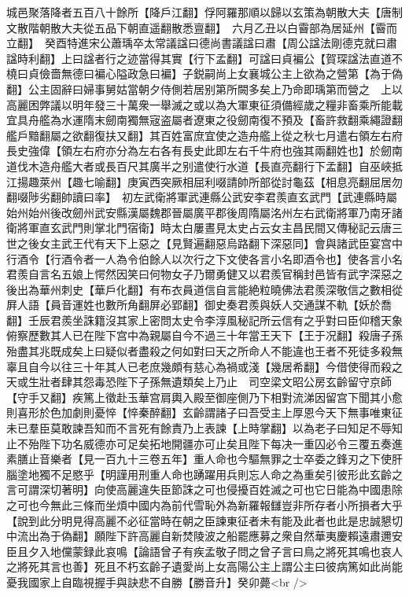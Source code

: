 城邑聚落降者五百八十餘所【降戶江翻】俘阿羅那順以歸以玄策為朝散大夫【唐制文散階朝散大夫從五品下朝直遥翻散悉亶翻】　六月乙丑以白霫部為居延州【霫而立翻】　癸酉特進宋公蕭瑀卒太常議諡曰德尚書議諡曰肅【周公諡法剛德克就曰肅諡時利翻】上曰諡者行之迹當得其實【行下孟翻】可諡曰貞褊公【賀琛諡法直道不橈曰貞儉嗇無德曰褊心隘政急曰褊】子鋭嗣尚上女襄城公主上欲為之營第【為于偽翻】公主固辭曰婦事舅姑當朝夕侍側若居别第所闕多矣上乃命即瑀第而營之　上以高麗困弊議以明年發三十萬衆一舉滅之或以為大軍東征須備經歲之糧非畜乘所能載宜具舟艦為水運隋末劒南獨無宼盗屬者遼東之役劒南復不預及【畜許救翻乘繩證翻艦戶黯翻屬之欲翻復扶又翻】其百姓富庶宜使之造舟艦上從之秋七月遣右領左右府長史強偉【領左右府亦分為左右各有長史此即左右千牛府也強其兩翻姓也】於劒南道伐木造舟艦大者或長百尺其廣半之别遣使行水道【長直亮翻行下孟翻】自巫峽抵江揚趣萊州【趣七喻翻】庚寅西突厥相屈利啜請帥所部從討龜茲【相息亮翻屈居勿翻啜陟劣翻帥讀曰率】　初左武衛將軍武連縣公武安李君羨直玄武門【武連縣時屬始州始州後改劒州武安縣漢屬魏郡晉屬廣平郡後周隋屬洺州左右武衛將軍乃南牙諸衛將軍直玄武門則掌北門宿衛】時太白屢晝見太史占云女主昌民間又傳秘記云唐三世之後女主武王代有天下上惡之【見賢遍翻惡烏路翻下深惡同】會與諸武臣宴宫中行酒令【行酒令者一人為令伯餘人以次行之下文使各言小名即酒令也】使各言小名君羨自言名五娘上愕然因笑曰何物女子乃爾勇健又以君羨官稱封邑皆有武字深惡之後出為華州刺史【華戶化翻】有布衣員道信自言能絶粒曉佛法君羨深敬信之數相從屛人語【員音運姓也數所角翻屏必郢翻】御史奏君羨與妖人交通謀不軌【妖於喬翻】壬辰君羨坐誅籍沒其家上密問太史令李淳風秘記所云信有之乎對曰臣仰稽天象俯察歷數其人已在陛下宫中為親屬自今不過三十年當王天下【王于况翻】殺唐子孫殆盡其兆既成矣上曰疑似者盡殺之何如對曰天之所命人不能違也王者不死徒多殺無辜且自今以往三十年其人已老庶幾頗有慈心為禍或淺【幾居希翻】今借使得而殺之天或生壯者肆其怨毒恐陛下子孫無遺類矣上乃止　司空梁文昭公房玄齡留守京師【守手又翻】疾篤上徵赴玉華宫肩輿入殿至御座側乃下相對流涕因留宫下聞其小愈則喜形於色加劇則憂悴【悴秦醉翻】玄齡謂諸子曰吾受主上厚恩今天下無事唯東征未已羣臣莫敢諫吾知而不言死有餘責乃上表諫【上時掌翻】以為老子曰知足不辱知止不殆陛下功名威德亦可足矣拓地開疆亦可止矣且陛下每决一重囚必令三覆五奏進素膳止音樂者【見一百九十三卷五年】重人命也今驅無罪之士卒委之鋒刃之下使肝腦塗地獨不足愍乎【明謹用刑重人命也踴躍用兵則忘人命之為重矣引彼形此玄齡之言可謂深切著明】向使高麗違失臣節誅之可也侵擾百姓滅之可也它日能為中國患除之可也今無此三條而坐煩中國内為前代雪恥外為新羅報讎豈非所存者小所損者大乎【說到此分明見得高麗不必征當時在朝之臣諫東征者未有能及此者也此是忠誠懇切中流出為于偽翻】願陛下許高麗自新焚陵波之船罷應募之衆自然華夷慶賴遠肅邇安臣且夕入地儻蒙録此哀鳴【論語曾子有疾孟敬子問之曾子言曰鳥之將死其鳴也哀人之將死其言也善】死且不朽玄齡子遺愛尚上女高陽公主上謂公主曰彼病篤如此尚能憂我國家上自臨視握手與訣悲不自勝【勝音升】癸卯薨<br />
